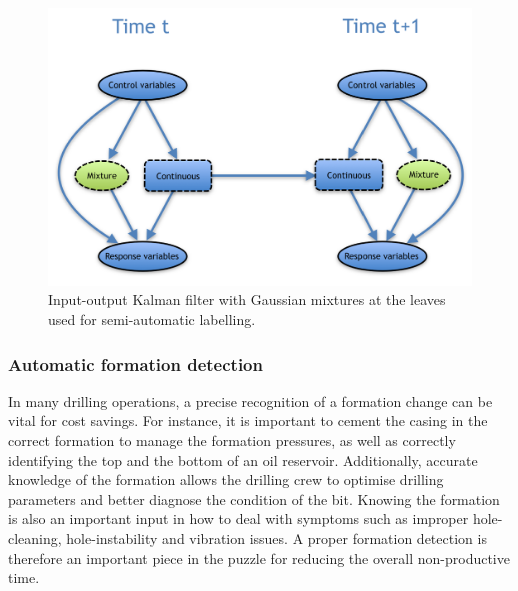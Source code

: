 \begin{figure}[ht!]
\begin{center}
\includegraphics[scale=0.5]{./figures/VT_Scenario2} 
\caption{\label{Figure:VTScenario2}  Input-output Kalman filter with Gaussian mixtures at the leaves used for semi-automatic labelling.}
\end{center}
\end{figure}


\subsubsection{Automatic formation detection}\label{SubSection:DetectionFormation}

In many drilling operations, a precise recognition of a formation change can be vital for cost savings. 
For instance, it is important to cement the casing in the correct formation to manage the formation pressures, as well as correctly identifying the top and the bottom of an oil reservoir. 
Additionally, accurate knowledge of the formation allows the drilling crew to optimise drilling parameters and better diagnose the condition of the bit. 
Knowing the formation is also an important input in how to deal with symptoms such as improper hole-cleaning, hole-instability and vibration issues. 
A proper formation detection is therefore an important piece in the puzzle for reducing the overall non-productive time.

